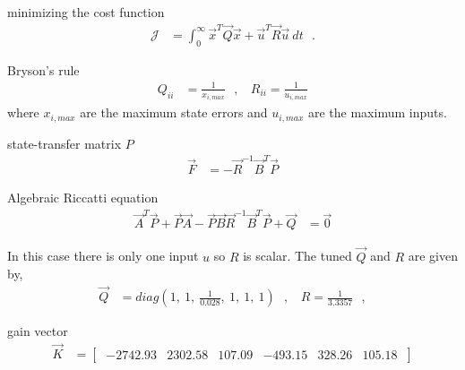 minimizing the cost function
\begin{align}
\mathcal{J} &= \int_{0}^{\infty} \vec{x}^T \vec{Q} \vec{x} + \vec{u}^T \vec{R} \vec{u} \ dt \ \ \ .
\label{eq:costFunctionLQR}
\end{align}

Bryson's rule
\begin{align}
  Q_{ii} &= \frac{1}{x_{i,max} }  \ \ \ , \ \ \ \ R_{ii} = \frac{1}{u_{i,max} }
\end{align}
where $x_{i,max}$ are the maximum state errors and $u_{i,max}$ are the maximum inputs.

state-transfer matrix $P$
\begin{align} 
\vec{F} &= -\vec{R}^{-1}\vec{B}^T\vec{P}
\label{eq:gainAndStateTransferMatrix}
\end{align}



Algebraic Riccatti equation
\begin{align} 
\vec{A}^T\vec{P}+\vec{P}\vec{A}-\vec{P}\vec{B}\vec{R}^{-1}\vec{B}^T\vec{P}+\vec{Q} &= \vec{0}
\label{eq:algebraicRiccattiEquation}
\end{align}




In this case there is only one input $u$ so $R$ is scalar. The tuned $\vec{Q}$ and $R$ are given by,
\begin{align}
  \vec{Q} &= diag( 1,\ 1,\ \tfrac{1}{ 0.028 },\ 1,\ 1,\ 1 )  \ \ \ , \ \ \ \
  R        = \frac{1}{ 3.3357 } \ \ \ ,
\end{align}

gain vector
\begin{align}
\vec{K} &= [\ 
             \begin{matrix}
               -2742.93 & 2302.58 & 107.09 & -493.15 & 328.26 & 105.18
             \end{matrix}
         \ ]
\end{align}


